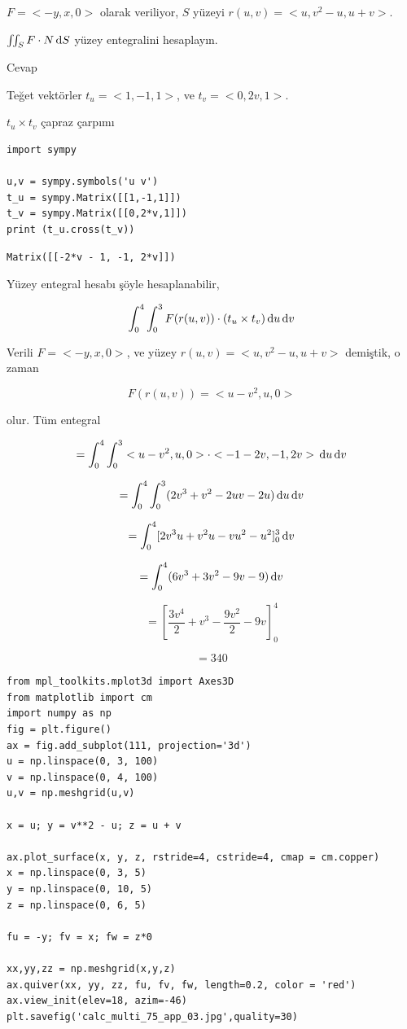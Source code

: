 \documentclass[12pt,fleqn]{article}\usepackage{../../common}
\begin{document}
$F = < -y, x, 0 >$ olarak veriliyor, $S$ yüzeyi $r(u,v) = < u, v^2 - u, u+v >$.

$\iint_S F \cdot N \,\mathrm{d} S$ yüzey entegralini hesaplayın.

Cevap

Teğet vektörler $t_u = < 1, -1, 1 >$, ve $t_v = < 0, 2v, 1 >$.

$t_u \times t_v$ çapraz çarpımı

\begin{verbatim}
import sympy

u,v = sympy.symbols('u v')
t_u = sympy.Matrix([[1,-1,1]])
t_v = sympy.Matrix([[0,2*v,1]])
print (t_u.cross(t_v))
\end{verbatim}

\begin{verbatim}
Matrix([[-2*v - 1, -1, 2*v]])
\end{verbatim}

Yüzey entegral hesabı şöyle hesaplanabilir,

$$
\int _{0}^{4} \int _{0}^{3} F(r(u,v)) \cdot (t_u \times t_v) \,\mathrm{d} u \,\mathrm{d} v
$$

Verili $F = < -y, x, 0 >$, ve yüzey $r(u,v) = < u, v^2 - u, u+v >$ demiştik,
o zaman 

$$
F(r(u,v)) = < u-v^2, u, 0 > 
$$

olur. Tüm entegral

$$
= \int _{0}^{4} \int _{0}^{3} < u-v^2, u, 0 >  \cdot < -1-2v, -1, 2v >
\,\mathrm{d} u \,\mathrm{d} v
$$

$$
= \int_{0}^{4} \int_{0}^{3} (2v^3 + v^2 -2uv -2u )
\,\mathrm{d} u \,\mathrm{d} v
$$

$$
= \int_{0}^{4} [ 2v^3u + v^2u - vu^2 - u^2 ]_{0}^{3} \,\mathrm{d} v
$$

$$
= \int_{0}^{4} (6v^3 + 3v^2 - 9v -9 ) \,\mathrm{d} v
$$

$$
= \left[ \frac{3v^4}{2} + v^3 - \frac{9v^2}{2} - 9v \right]_{0}^{4}
$$

$$
= 340
$$

\begin{verbatim}
from mpl_toolkits.mplot3d import Axes3D
from matplotlib import cm
import numpy as np
fig = plt.figure()
ax = fig.add_subplot(111, projection='3d')
u = np.linspace(0, 3, 100)
v = np.linspace(0, 4, 100)
u,v = np.meshgrid(u,v)

x = u; y = v**2 - u; z = u + v

ax.plot_surface(x, y, z, rstride=4, cstride=4, cmap = cm.copper)
x = np.linspace(0, 3, 5)
y = np.linspace(0, 10, 5)
z = np.linspace(0, 6, 5)

fu = -y; fv = x; fw = z*0

xx,yy,zz = np.meshgrid(x,y,z)
ax.quiver(xx, yy, zz, fu, fv, fw, length=0.2, color = 'red')
ax.view_init(elev=18, azim=-46)
plt.savefig('calc_multi_75_app_03.jpg',quality=30)
\end{verbatim}
\end{document}
